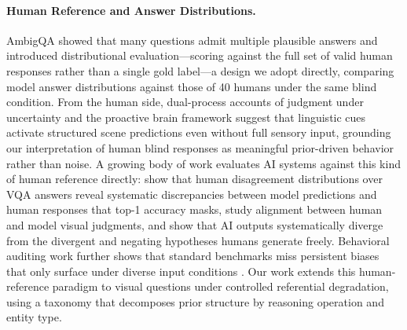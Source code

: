 \documentclass[letterpaper]{article}
\begin{document}
\paragraph{Human Reference and Answer Distributions.}
AmbigQA \citep{min2020ambigqa} showed that many questions admit multiple plausible
answers and introduced distributional evaluation---scoring against the full set of
valid human responses rather than a single gold label---a design we adopt directly,
comparing model answer distributions against those of 40 humans under the same blind condition.
From the human side, dual-process accounts of judgment under uncertainty
\citep{tversky1974judgment,kahneman2011thinking} and the proactive brain framework
\citep{bar2007proactive} suggest that linguistic cues activate structured scene
predictions even without full sensory input, grounding our interpretation of human
blind responses as meaningful prior-driven behavior rather than noise.
A growing body of work evaluates AI systems against this kind of human reference
directly: \citet{lan2025mind} show that human disagreement distributions over VQA answers
reveal systematic discrepancies between model predictions and human responses
that top-1 accuracy masks, \citet{lee2023visalign} study alignment between human and model visual
judgments, and \citet{bao2026imagination} show that AI outputs systematically diverge
from the divergent and negating hypotheses humans generate freely.
Behavioral auditing work further shows that standard benchmarks miss persistent
biases that only surface under diverse input conditions
\citep{rottger2025safetyprompts,kwon2025whatllms}.
Our work extends this human-reference paradigm to visual questions under controlled
referential degradation, using a taxonomy that decomposes prior structure by
reasoning operation and entity type.
\end{document}
